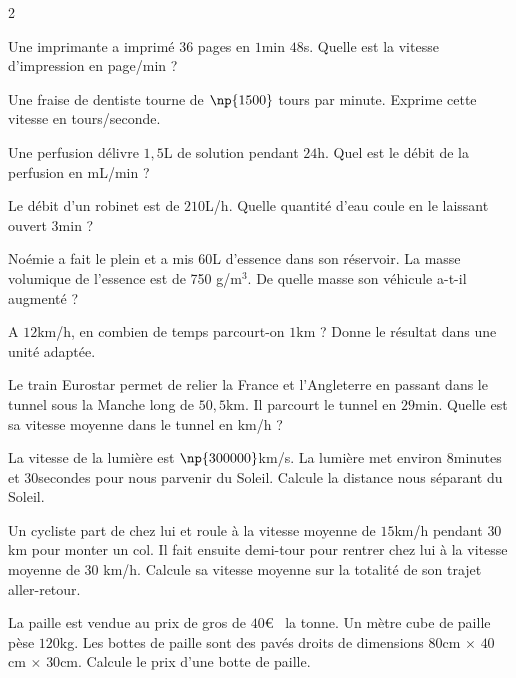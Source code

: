 \documentclass[a4paper,10pt]{report}
\begin{document}
\begin{multicols}{2}
\begin{ex}
Une imprimante a imprimé $36$ pages en $1$min $48$s. Quelle est la vitesse d'impression en page/min ?
\end{ex}

\begin{ex}
Une fraise de dentiste tourne de $\np{1 500}$ tours par minute. Exprime cette vitesse en tours/seconde.
\end{ex}

\begin{ex}
Une perfusion délivre $1,5$L de solution pendant $24$h. Quel est le débit de la perfusion en mL/min ?
\end{ex}

\begin{ex}
Le débit d'un robinet est de $210$L/h. Quelle quantité d'eau coule en le laissant ouvert $3$min ?
\end{ex}

\begin{ex}
Noémie a fait le plein et a mis $60$L d'essence dans son réservoir. La masse volumique de l'essence est de 750 g/m$^3$. De quelle masse son véhicule a-t-il augmenté ?
\end{ex}

\begin{ex}
A $12$km/h, en combien de temps parcourt-on $1$km ? Donne le résultat dans une unité adaptée.
\end{ex}

\begin{ex}
Le train Eurostar permet de relier la France et l'Angleterre en passant dans le tunnel sous la Manche long de $50,5$km. Il parcourt le tunnel en $29$min. Quelle est sa vitesse moyenne dans le tunnel en km/h ?
\end{ex}

\begin{ex}
La vitesse de la lumière est $\np{300 000}$km/s. La lumière met environ $8$minutes et $30$secondes pour nous parvenir du Soleil. Calcule la distance nous séparant du Soleil.
\end{ex}

\begin{ex}
Un cycliste part de chez lui et roule à la vitesse moyenne de $15$km/h pendant $30$km pour monter un col. Il fait ensuite demi-tour pour rentrer chez lui à la vitesse moyenne de 30 km/h. Calcule sa vitesse moyenne sur la totalité de son trajet aller-retour.
\end{ex}

\begin{ex}
La paille est vendue au prix de gros de $40$\euro~ la tonne. Un mètre cube de paille pèse $120$kg. Les bottes de paille sont des pavés droits de dimensions $80$cm $\times$ $40$cm $\times$ $30$cm. Calcule le prix d'une botte de paille.
\end{ex}


\end{multicols}
\end{document}
